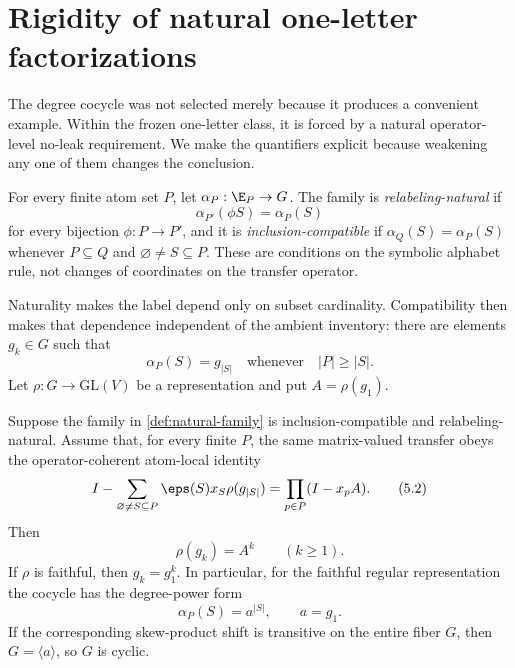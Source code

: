 \section{Rigidity of natural one-letter factorizations}
\label{sec:rigidity}

The degree cocycle was not selected merely because it produces a convenient
example.  Within the frozen one-letter class, it is forced by a natural
operator-level no-leak requirement.  We make the quantifiers explicit because
weakening any one of them changes the conclusion.

\begin{definition}
\label{def:natural-family}
For every finite atom set \(P\), let
\(\alpha_P:\E_P\to G\).  The family is \emph{relabeling-natural} if
\[
\alpha_{P'}(\phi S)=\alpha_P(S)
\]
for every bijection \(\phi:P\to P'\), and it is
\emph{inclusion-compatible} if
\(\alpha_Q(S)=\alpha_P(S)\) whenever \(P\subseteq Q\) and
\(\varnothing\ne S\subseteq P\).  These are conditions on the symbolic
alphabet rule, not changes of coordinates on the transfer operator.
\end{definition}

Naturality makes the label depend only on subset cardinality.  Compatibility
then makes that dependence independent of the ambient inventory: there are
elements \(g_k\in G\) such that
\[
\alpha_P(S)=g_{|S|}
\quad\text{whenever}\quad |P|\ge |S|.
\tag{5.1}\label{5.1}
\]
Let \(\rho:G\to \mathrm{GL}(V)\) be a representation and put
\(A=\rho(g_1)\).

\begin{theorem}
\label{thm:rigidity}
Suppose the family in \cref{def:natural-family} is inclusion-compatible and
relabeling-natural.  Assume that, for every finite \(P\), the same
matrix-valued transfer obeys the operator-coherent atom-local identity
\[
I-\sum_{\varnothing\ne S\subseteq P}
  \eps(S)x_S\rho(g_{|S|})
=\prod_{p\in P}(I-x_pA).
\tag{5.2}\label{5.2}
\]
Then
\[
\rho(g_k)=A^k\qquad(k\ge1).
\tag{5.3}\label{5.3}
\]
If \(\rho\) is faithful, then \(g_k=g_1^k\).  In particular, for the faithful
regular representation the cocycle has the degree-power form
\[
\alpha_P(S)=a^{|S|},\qquad a=g_1.
\tag{5.4}\label{5.4}
\]
If the corresponding skew-product shift is transitive on the entire fiber
\(G\), then \(G=\langle a\rangle\), so \(G\) is cyclic.
\end{theorem}


